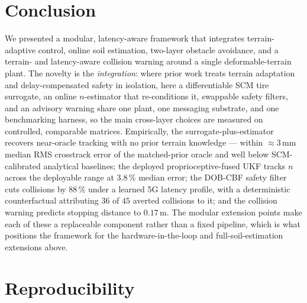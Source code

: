 \documentclass[conference,letterpaper,10pt]{IEEEtran}
\begin{document}
\section{Conclusion}
\label{sec:conclusion}
We presented a modular, latency-aware framework that integrates
terrain-adaptive control, online soil estimation, two-layer obstacle
avoidance, and a terrain- and latency-aware collision warning around a
single deformable-terrain plant. The novelty is the \emph{integration}:
where prior work treats terrain adaptation and delay-compensated safety
in isolation, here a differentiable SCM tire surrogate, an online
$n$-estimator that re-conditions it, swappable safety filters, and an
advisory warning share one plant, one messaging substrate, and one
benchmarking harness, so the main cross-layer choices are measured on
controlled, comparable matrices. Empirically, the surrogate-plus-estimator recovers
near-oracle tracking with no prior terrain knowledge --- within
$\approx\!3\,\mathrm{mm}$ median RMS crosstrack error of the
matched-prior oracle and well below SCM-calibrated analytical baselines;
the deployed proprioceptive-fused UKF tracks $n$ across the deployable
range at $3.8\,\%$ median error; the DOB-CBF safety filter cuts collisions
by $88\,\%$ under a learned 5G latency profile, with a deterministic
counterfactual attributing $36$ of $45$ averted collisions to it;
and the collision warning predicts stopping distance to $0.17\,\mathrm{m}$. The modular
extension points make each of these a replaceable component rather than a
fixed pipeline, which is what positions the framework for the
hardware-in-the-loop and full-soil-estimation extensions above.

\section*{Reproducibility}
\end{document}
